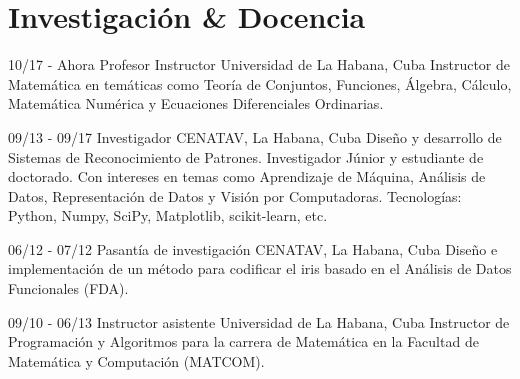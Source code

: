 \documentclass[]{friggeri-cv}
\begin{document}
\section{Investigación \& Docencia}
\begin{entrylist}
  \entry
    {10/17 - Ahora}
    {Profesor Instructor}
    {Universidad de La Habana, Cuba}
    {Instructor de Matemática en temáticas como Teoría de Conjuntos, Funciones, Álgebra, Cálculo, Matemática Numérica y Ecuaciones Diferenciales Ordinarias.\\}
  
  \entry
    {09/13 - 09/17}
    {Investigador}
    {CENATAV, La Habana, Cuba}
    {Diseño y desarrollo de Sistemas de Reconocimiento de Patrones. Investigador Júnior y estudiante de doctorado. Con intereses en temas como Aprendizaje de Máquina, Análisis de Datos, Representación de Datos y Visión por Computadoras. Tecnologías: Python, Numpy, SciPy, Matplotlib, scikit-learn, etc.\\}
    
  \entry
    {06/12 - 07/12}
    {Pasantía de investigación}
    {CENATAV, La Habana, Cuba}
    {Diseño e implementación de un método para codificar el iris basado en el Análisis de Datos Funcionales (FDA).\\}
    
  \entry
    {09/10 - 06/13}
    {Instructor asistente}
    {Universidad de La Habana, Cuba}
    {Instructor  de Programación y Algoritmos para la carrera de Matemática en la Facultad de Matemática y Computación (MATCOM).\\}
\end{entrylist}
\end{document}
